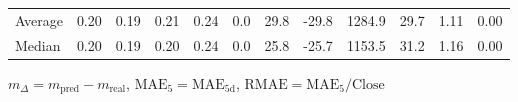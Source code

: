 \begin{threeparttable}
{\begin{tabular}{lrrrrrrrrrrr}
Average &          0.20 &          0.19 &          0.21 &        0.24 &                 0.0 &                29.8 &      -29.8 &              1284.9 &             29.7 &            1.11 &                   0.00 \\
 Median &          0.20 &          0.19 &          0.20 &        0.24 &                 0.0 &                25.8 &      -25.7 &              1153.5 &             31.2 &            1.16 &                   0.00 \\
\bottomrule
\end{tabular}
}
\begin{tablenotes}\footnotesize
\item $m_\Delta=m_{\text{pred}}-m_{\text{real}}$,
$\mathrm{MAE}_5=\mathrm{MAE}_{5\text{d}}$,
$\mathrm{RMAE}=\mathrm{MAE}_5/\text{Close}$
\end{tablenotes}
\end{threeparttable}
\endgroup

